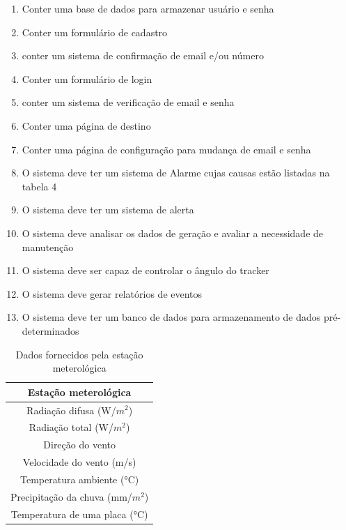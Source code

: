 \documentclass[a4paper,12pt]{article}
\begin{document}
\begin{enumerate}
    \item Conter uma base de dados para armazenar usuário e senha
    \item Conter um formulário de cadastro
    \item conter um sistema de confirmação de email e/ou número
    \item Conter um formulário de login
    \item conter um sistema de verificação de email e senha
    \item Conter uma página de destino
    \item Conter uma página de configuração para mudança de email e senha
    
    \item O sistema deve ter um sistema de Alarme cujas causas estão listadas na tabela 4
    
    \item O sistema deve ter um sistema de alerta
    \item O sistema deve analisar os dados de geração e avaliar a necessidade de manutenção
    \item O sistema deve ser capaz de controlar o ângulo do tracker
    \item O sistema deve gerar relatórios de eventos
    \item O sistema deve ter um banco de dados para armazenamento de dados pré-determinados

\end{enumerate}


    \begin{table}[htbp]
    \begin{center}
    \begin{tabular}{|c|}
    \hline
       \textbf{Estação meterológica} \\ \hline
        Radiação difusa (W/$m^2$)\\
        Radiação total (W/$m^2$) \\
        Direção do vento \\
        Velocidade do vento (m/s)\\
        Temperatura ambiente (°C)\\
        Precipitação da chuva (mm/$m^2$)\\
        Temperatura de uma placa (°C) \\
        \hline
    \end{tabular}
    \caption{Dados fornecidos pela estação meterológica }
    \end{center}
    \end{table}
\end{document}
